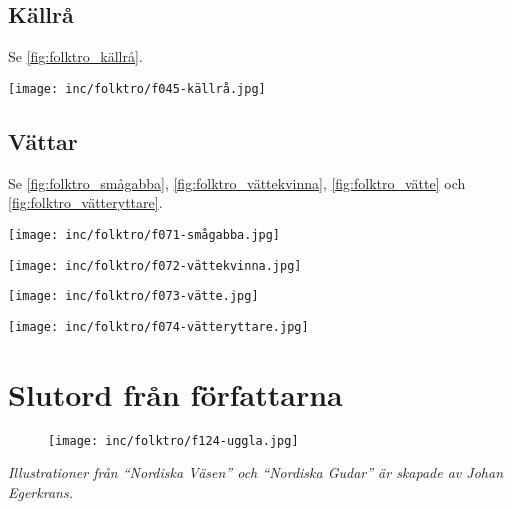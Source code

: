 \documentclass[10pt,twoside,twocolumn,openany]{dndbook}
\begin{document}

\section{Källrå}

Se \ref{fig:folktro_källrå}.

\begin{figure*}[htbp]
	\center
	\texttt{[image: inc/folktro/f045-källrå.jpg]}
	\caption{Källrå}
	\label{fig:folktro_källrå}
\end{figure*}


\section{Vättar}

Se \ref{fig:folktro_smågabba}, \ref{fig:folktro_vättekvinna}, \ref{fig:folktro_vätte} och \ref{fig:folktro_vätteryttare}.

\begin{figure*}[htbp]
	\center
	\texttt{[image: inc/folktro/f071-smågabba.jpg]}
	\caption{Smågabba}
	\label{fig:folktro_smågabba}
\end{figure*}

\begin{figure*}[htbp]
	\center
	\texttt{[image: inc/folktro/f072-vättekvinna.jpg]}
	\caption{Vättekvinna}
	\label{fig:folktro_vättekvinna}
\end{figure*}

\begin{figure*}[htbp]
	\center
	\texttt{[image: inc/folktro/f073-vätte.jpg]}
	\caption{Vätte}
	\label{fig:folktro_vätte}
\end{figure*}

\begin{figure*}[htbp]
	\center
	\texttt{[image: inc/folktro/f074-vätteryttare.jpg]}
	\caption{Vätteryttare}
	\label{fig:folktro_vätteryttare}
\end{figure*}


\onecolumn

\chapter{Slutord från författarna}


\vspace{6em}

\begin{figure}[htbp]
	\center
	\texttt{[image: inc/folktro/f124-uggla.jpg]}
\end{figure}

\textit{Illustrationer från ``Nordiska Väsen'' och ``Nordiska Gudar'' är skapade av Johan Egerkrans.}
\end{document}
